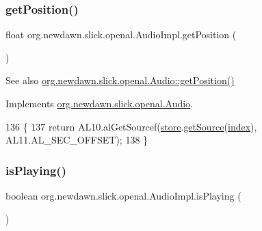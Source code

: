 \subsubsection{\texorpdfstring{get\+Position()}{getPosition()}}
{\footnotesize\ttfamily float org.\+newdawn.\+slick.\+openal.\+Audio\+Impl.\+get\+Position (\begin{DoxyParamCaption}{ }\end{DoxyParamCaption})\hspace{0.3cm}{\ttfamily [inline]}}

\begin{DoxySeeAlso}{See also}
\mbox{\hyperlink{interfaceorg_1_1newdawn_1_1slick_1_1openal_1_1_audio_aa838b5606c0aa5f23dd46ac5918bb717}{org.\+newdawn.\+slick.\+openal.\+Audio\+::get\+Position()}} 
\end{DoxySeeAlso}


Implements \mbox{\hyperlink{interfaceorg_1_1newdawn_1_1slick_1_1openal_1_1_audio_aa838b5606c0aa5f23dd46ac5918bb717}{org.\+newdawn.\+slick.\+openal.\+Audio}}.


\begin{DoxyCode}
136                                \{
137         \textcolor{keywordflow}{return} AL10.alGetSourcef(\mbox{\hyperlink{classorg_1_1newdawn_1_1slick_1_1openal_1_1_audio_impl_a1f616264ac2d6ec44cb0c187836d34f5}{store}}.\mbox{\hyperlink{classorg_1_1newdawn_1_1slick_1_1openal_1_1_sound_store_a36b83b67fccef1cd5167d2ea11e89f6a}{getSource}}(\mbox{\hyperlink{classorg_1_1newdawn_1_1slick_1_1openal_1_1_audio_impl_ab0e80c9c431d4b6c9b667012f7f71b86}{index}}), AL11.AL\_SEC\_OFFSET);
138     \}
\end{DoxyCode}
\mbox{\label{classorg_1_1newdawn_1_1slick_1_1openal_1_1_audio_impl_a842212ec52d43824dee1d7c6e7fa4ce1}} 
\subsubsection{\texorpdfstring{is\+Playing()}{isPlaying()}}
{\footnotesize\ttfamily boolean org.\+newdawn.\+slick.\+openal.\+Audio\+Impl.\+is\+Playing (\begin{DoxyParamCaption}{ }\end{DoxyParamCaption})\hspace{0.3cm}{\ttfamily [inline]}}

